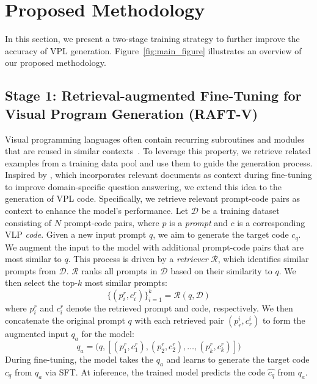 \section{Proposed Methodology}
In this section, we present a two-stage training strategy to further improve the accuracy of VPL generation. Figure~\ref{fig:main_figure} illustrates an overview of our proposed methodology.

\subsection{Stage 1: Retrieval-augmented Fine-Tuning for Visual Program Generation (RAFT-V)}
Visual programming languages often contain recurring subroutines and modules that are reused in similar contexts~\cite{Terra_Neves_2021}. To leverage this property, we retrieve related examples from a training data pool and use them to guide the generation process. Inspired by \citet{zhang2024raft}, which incorporates relevant documents as context during fine-tuning to improve domain-specific question answering, we extend this idea to the generation of VPL code. Specifically, we retrieve relevant prompt-code pairs as context to enhance the model’s performance.
Let $\mathcal{D}$ be a training dataset consisting of \(N\) prompt-code pairs, where $p$ is a \textit{prompt} and $c$ 
is a corresponding VLP \textit{code}. Given a new input prompt \(q\), we aim to generate the target code \(c_q\). We augment the input to the model with additional prompt-code pairs that are most similar to \(q\). This process is driven by a \textit{retriever} \(\mathcal{R}\), which identifies similar prompts from \(\mathcal{D}\).  \(\mathcal{R}\) ranks all prompts in \(\mathcal{D}\) based on their similarity to \(q\). We then select the top-\(k\) most similar prompts:
\begin{equation}
    \{(p_{i}^r, c_{i}^r)\}_{i=1}^{k} = \mathcal{R}(q, \mathcal{D})
\end{equation}
where \(p_i^r\) and \(c_i^r\) denote the retrieved prompt and code, respectively. We then concatenate the original prompt \(q\) with each retrieved pair \((p_r^i, c_r^i)\) to form the augmented input $q_a$ for the model:
\begin{equation}
    q_a =\bigl(q, [(p_1^r, c_1^r), (p_2^r, c_2^r), \dots, (p_k^r, c_k^r)]\bigr)
\end{equation}
During fine-tuning, the model takes the $q_a$ and learns to generate the target code \(c_q\) from $q_a$ via SFT. At inference, the trained model predicts the code \(\hat{c_q}\) from $q_a$.


